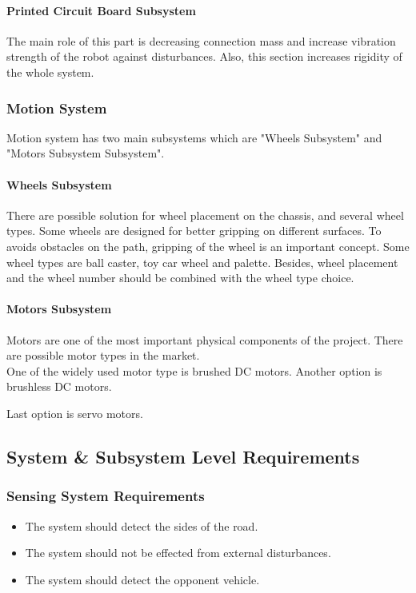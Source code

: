 \documentclass[a4paper,12pt]{article}
\begin{document}
		\paragraph{Printed Circuit Board Subsystem}
			The main role of this part is decreasing connection mass and increase vibration strength of the robot against disturbances. Also, this section increases rigidity of the whole system. 
	
	
	\subsubsection{Motion System}
			
			Motion system has two main subsystems which are "Wheels Subsystem" and "Motors Subsystem Subsystem".		
		
		
		\paragraph{Wheels Subsystem}
			There are possible solution for wheel placement on the chassis, and several wheel types. Some wheels are designed for better gripping on different surfaces. To avoids obstacles on the path, gripping of the wheel is an important concept. Some wheel types are ball caster, toy car wheel and palette. Besides, wheel placement and the wheel number should be combined with the wheel type choice. \\
	
			
		\paragraph{Motors Subsystem}
			Motors are one of the most important physical components of the project. There are possible motor types in the market.\\

			One of the widely used motor type is brushed DC motors. 
			Another option is brushless DC motors. 

			Last option is servo motors.
\subsection{System \& Subsystem Level Requirements}
		
	
	\subsubsection{Sensing System Requirements}
	
		\begin{itemize}
			\item The system should detect the sides of the road.
			\item The system should not be effected from external disturbances.
			\item The system should detect the opponent vehicle.
		\end{itemize}
\end{document}
